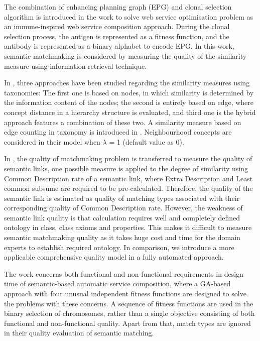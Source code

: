 \documentclass{IEEEtran}
\begin{document}
The combination of enhancing planning graph (EPG) and clonal selection algorithm is introduced in the work \cite{pop2009immune}  to solve web service optimisation problem as an immune-inspired web service composition approach. During the clonal selection process, the antigen is represented as a fitness function, and the antibody is represented as a binary alphabet to encode EPG. In this work,  semantic matchmaking is considered by measuring the quality of the similarity measure using information retrieval technique.

In \cite{shet2012new}, three approaches have been studied regarding the similarity measures using taxonomies: The first one is based on nodes, in which similarity is determined by the information content of the nodes; the second is entirely based on edge, where concept distance in a hierarchy structure is evaluated, and third one is the hybrid approach features a combination of these two. A similarity measure based on edge counting in taxonomy is introduced in \cite{shet2012new}. Neighbourhood concepts are considered in their model when $\lambda$ = 1 (default value as 0).

In \cite{lecue2009optimizing}, the quality of matchmaking problem is transferred to measure the quality of semantic links, one possible measure is applied to the degree of similarity using Common Description rate of a semantic link, where Extra Description and Least common subsume are required to be pre-calculated. Therefore, the quality of the semantic link is estimated as quality of matching types associated with their corresponding quality of Common Description rate. However, the weakness of semantic link quality is that calculation requires well and completely defined ontology in class, class axioms and properties. This makes it difficult to measure semantic matchmaking quality as it takes huge cost and time for the domain experts to establish required ontology. In comparison, we introduce a more applicable comprehensive quality model in a fully automated approach.

The work \cite{fanjiang2014semantic} concerns both functional and non-functional requirements in design time of semantic-based automatic service composition, where a GA-based approach with four unusual independent fitness functions are designed to solve the problems with these concerns. A sequence of fitness functions are used in the binary selection of chromosomes, rather than a single objective consisting of both functional and non-functional quality. Apart from that, match types are ignored in their quality evaluation of semantic matching.
\end{document}
